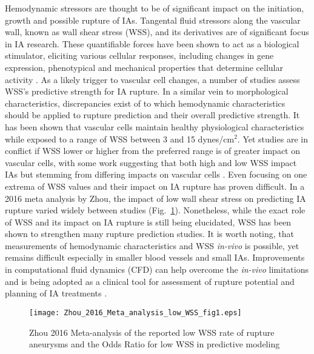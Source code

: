 Hemodynamic stressors are thought to be of significant impact on the initiation, growth and possible rupture of IAs. Tangental fluid stressors along the vascular wall, known as wall shear stress (WSS), and its derivatives are of significant focus in IA research. These quantifiable forces have been shown to act as a biological stimulator, eliciting various cellular responses, including changes in gene expression, phenotypical and mechanical properties that determine cellular activity \cite{baek2009flow,van2010analyzing,dolan2013high,sato2000local,baeyens2016endothelial,byrne2014quantifying,cecchi2011role,kulcsar2011hemodynamics}. As a likely trigger to vascular cell changes, a number of studies assess WSS's predictive strength for IA rupture. In a similar vein to morphological characteristics, discrepancies exist of to which hemodynamic characteristics should be applied to rupture prediction and their overall predictive strength. It has been shown that vascular cells maintain healthy physiological characteristics while exposed to a range of WSS between 3 and 15 dynes/cm$^{2}$. Yet studies are in conflict if WSS lower \cite{Miura519,boussel2008aneurysm} or higher \cite{dolan2013high,shojima2004magnitude} from the preferred range is of greater impact on vascular cells, with some work suggesting that both high and low WSS impact IAs but stemming from differing impacts on vascular cells \cite{Meng1254}. Even focusing on one extrema of WSS values and their impact on IA rupture has proven difficult. In a 2016 meta analysis by Zhou, the impact of low wall shear stress on predicting IA rupture varied widely between studies (Fig.~\ref{Low_WSS_meta_analysis}). Nonetheless, while the exact role of WSS and its impact on IA rupture is still being elucidated, WSS has been shown to strengthen many rupture prediction studies. It is worth noting, that measurements of hemodynamic characteristics and WSS \textit{in-vivo} is possible, yet remains difficult especially in smaller blood vessels and small IAs. Improvements in computational fluid dynamics (CFD) can help overcome the \textit{in-vivo} limitations and is being adopted as a clinical tool for assessment of rupture potential and planning of IA treatments \cite{steinman2002image,valen2013mind}. 

\begin{figure}[!h]
\begin{center}
\texttt{[image: Zhou\_2016\_Meta\_analysis\_low\_WSS\_fig1.eps]}
\captionsetup{width=0.5\textwidth, justification=justified,singlelinecheck=false}
\caption{Zhou 2016 Meta-analysis of the reported low WSS rate of rupture aneurysms and the Odds Ratio for low WSS in predictive modeling}
\end{center}
\label{Low_WSS_meta_analysis}
\end{figure}
 


